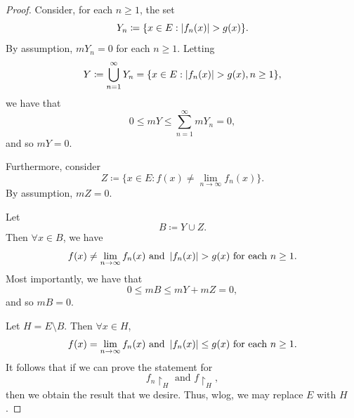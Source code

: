 \documentclass[notoc,notitlepage]{tufte-book}
\begin{document}
\begin{proof}
  Consider, for each $n \geq 1$, the set
  \begin{equation*}
    Y_n \coloneqq \{ x \in E : \left|f_n(x)\right| > g(x) \}.
  \end{equation*}
  By assumption, $mY_n = 0$ for each $n \geq 1$. Letting
  \begin{equation*}
    Y \coloneqq \bigcup_{n=1}^{\infty} Y_n = \{ x \in E : \left|f_n(x)\right| > g(x), n
    \geq 1 \},
  \end{equation*}
  we have that
  \begin{equation*}
    0 \leq mY \leq \sum_{n=1}^{\infty} mY_n = 0,
  \end{equation*}
  and so $mY = 0$.

  Furthermore, consider
  \begin{equation*}
    Z \coloneqq \{ x \in E : f(x) \neq \lim_{n \to \infty} f_n(x) \}.
  \end{equation*}
  By assumption, $mZ = 0$.

  Let
  \begin{equation*}
    B \coloneqq Y \cup Z.
  \end{equation*}
  Then $\forall x \in B$, we have
  \begin{equation*}
    f(x) \neq \lim_{n \to \infty} f_n(x) \text{ and }
    \left|f_n(x)\right| > g(x) \text{ for each } n \geq 1.
  \end{equation*}
  Most importantly, we have that
  \begin{equation*}
    0 \leq mB \leq mY + mZ = 0,
  \end{equation*}
  and so $mB = 0$.

  Let $H = E \setminus B$. Then $\forall x \in H$,
  \begin{equation*}
    f(x) = \lim_{n \to \infty} f_n(x) \text{ and }
    \left|f_n(x)\right| \leq g(x) \text{ for each } n \geq 1.
  \end{equation*}
  It follows that if we can prove the statement for
  \begin{equation*}
    f_n \restriction_{H} \text{ and } f \restriction_H,
  \end{equation*}
  then we obtain the result that we desire. Thus, wlog, we may replace $E$ with
  $H$.


\end{proof}
\end{document}
